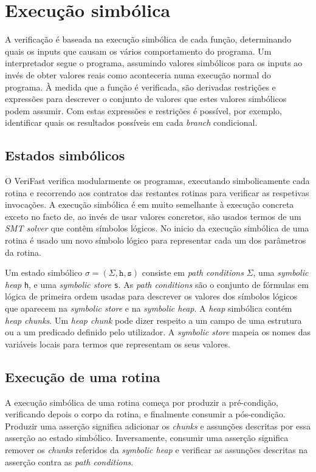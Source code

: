 \section{Execução simbólica}

A verificação é baseada na execução simbólica de cada função, determinando quais os inputs que causam os vários comportamento do programa. Um interpretador segue o programa, assumindo valores simbólicos para os inputs ao invés de obter valores reais como aconteceria numa execução normal do programa. À medida que a função é verificada, são derivadas restrições e expressões para descrever o conjunto de valores que estes valores simbólicos podem assumir. Com estas expressões e restrições é possível, por exemplo, identificar quais os resultados possíveis em cada \emph{branch} condicional.

\subsection{Estados simbólicos}

O VeriFast verifica modularmente os programas, executando simbolicamente cada rotina e recorrendo aos contratos das restantes rotinas para verificar as respetivas invocações. A execução simbólica é em muito semelhante à execução concreta exceto no facto de, ao invés de usar valores concretos, são usados termos de um \textit{SMT solver} que contêm símbolos lógicos. No inicio da execução simbólica de uma rotina é usado um novo símbolo lógico para representar cada um dos parâmetros da rotina.

Um estado simbólico $\sigma = (\Sigma, \texttt{h}, \texttt{s})$ consiste em \textit{path conditions} $\Sigma$, uma \textit{symbolic heap} \texttt{h}, e uma \textit{symbolic store} \texttt{s}. As \textit{path conditions} são o conjunto de fórmulas em lógica de primeira ordem usadas para descrever os valores dos símbolos lógicos que aparecem na \textit{symbolic store} e na \textit{symbolic heap}. A \textit{heap} simbólica contém \textit{heap chunks}. Um \textit{heap chunk} pode dizer respeito a um campo de uma estrutura ou a um predicado definido pelo utilizador. A \textit{symbolic store} mapeia os nomes das variáveis locais para termos que representam os seus valores.

\subsection{Execução de uma rotina}

A execução simbólica de uma rotina começa por produzir a pré-condição, verificando depois o corpo da rotina, e finalmente consumir a pós-condição. Produzir uma asserção significa adicionar os \textit{chunks} e assunções descritas por essa asserção ao estado simbólico. Inversamente, consumir uma asserção significa remover os \textit{chunks} referidos da \textit{symbolic heap} e verificar as assunções descritas na asserção contra as \textit{path conditions}.

